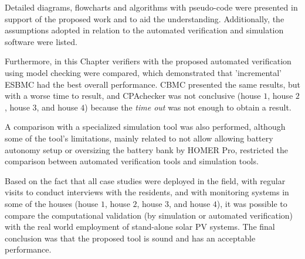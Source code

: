 Detailed diagrams, flowcharts and algorithms with pseudo-code were presented in support of the proposed work and to aid the understanding. Additionally, the assumptions adopted in relation to the automated verification and simulation software were listed.

Furthermore, in this Chapter verifiers with the proposed automated verification using model checking were compared, which demonstrated that 'incremental' ESBMC had the best overall performance. CBMC presented the same results, but with a worse time to result, and CPAchecker was not conclusive (house $1$, house $2$, house $3$, and house $4$) because the \textit{time out} was not enough to obtain a result.

A comparison with a specialized simulation tool was also performed, although some of the tool's limitations, mainly related to not allow allowing battery autonomy setup or oversizing the battery bank by HOMER Pro, restricted the comparison between automated verification tools and simulation tools.

Based on the fact that all case studies were deployed in the field, with regular visits to conduct interviews with the residents, and with monitoring systems in some of the houses (house $1$, house $2$, house $3$, and house $4$), it was possible to compare the computational validation (by simulation or automated verification) with the real world employment of stand-alone solar PV systems. The final conclusion was that the proposed tool is sound and has an acceptable performance. 
